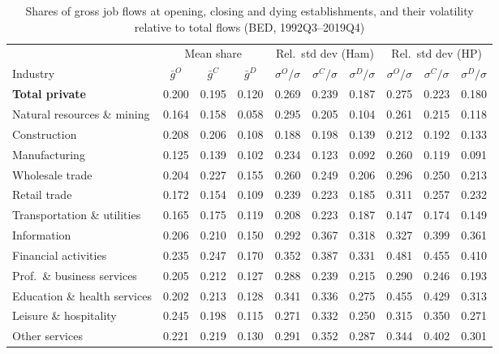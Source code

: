 \documentclass[authoryear, review, 12pt]{elsarticle}
\begin{document}
	\begin{table}[H]
\centering
\small
\caption{Shares of gross job flows at opening, closing and dying establishments, and their volatility relative to total flows (BED, 1992Q3--2019Q4)}
\label{tab:jf_t2_ext_2019}
\setlength{\tabcolsep}{4pt}
\begin{tabular}{lccccccccc}
\toprule
 & \multicolumn{3}{c}{Mean share} & \multicolumn{3}{c}{Rel.\ std dev (Ham)} & \multicolumn{3}{c}{Rel.\ std dev (HP)} \\
\cmidrule(lr){2-4}\cmidrule(lr){5-7}\cmidrule(lr){8-10}
Industry & $\bar{g}^O$ & $\bar{g}^C$ & $\bar{g}^D$ & $\sigma^O/\sigma$ & $\sigma^C/\sigma$ & $\sigma^D/\sigma$ & $\sigma^O/\sigma$ & $\sigma^C/\sigma$ & $\sigma^D/\sigma$ \\
\midrule
\midrule
\textbf{Total private} & 0.200 & 0.195 & 0.120 & 0.269 & 0.239 & 0.187 & 0.275 & 0.223 & 0.180 \\
Natural resources \& mining & 0.164 & 0.158 & 0.058 & 0.295 & 0.205 & 0.104 & 0.261 & 0.215 & 0.118 \\
Construction & 0.208 & 0.206 & 0.108 & 0.188 & 0.198 & 0.139 & 0.212 & 0.192 & 0.133 \\
Manufacturing & 0.125 & 0.139 & 0.102 & 0.234 & 0.123 & 0.092 & 0.260 & 0.119 & 0.091 \\
Wholesale trade & 0.204 & 0.227 & 0.155 & 0.260 & 0.249 & 0.206 & 0.296 & 0.250 & 0.213 \\
Retail trade & 0.172 & 0.154 & 0.109 & 0.239 & 0.223 & 0.185 & 0.311 & 0.257 & 0.232 \\
Transportation \& utilities & 0.165 & 0.175 & 0.119 & 0.208 & 0.223 & 0.187 & 0.147 & 0.174 & 0.149 \\
Information & 0.206 & 0.210 & 0.150 & 0.292 & 0.367 & 0.318 & 0.327 & 0.399 & 0.361 \\
Financial activities & 0.235 & 0.247 & 0.170 & 0.352 & 0.387 & 0.331 & 0.481 & 0.455 & 0.410 \\
Prof.~\& business services & 0.205 & 0.212 & 0.127 & 0.288 & 0.239 & 0.215 & 0.290 & 0.246 & 0.193 \\
Education \& health services & 0.202 & 0.213 & 0.128 & 0.341 & 0.336 & 0.275 & 0.455 & 0.429 & 0.313 \\
Leisure \& hospitality & 0.245 & 0.198 & 0.115 & 0.271 & 0.332 & 0.250 & 0.315 & 0.350 & 0.271 \\
Other services & 0.221 & 0.219 & 0.130 & 0.291 & 0.352 & 0.287 & 0.344 & 0.402 & 0.301 \\
\midrule

\end{tabular}
\end{table}
\end{document}
